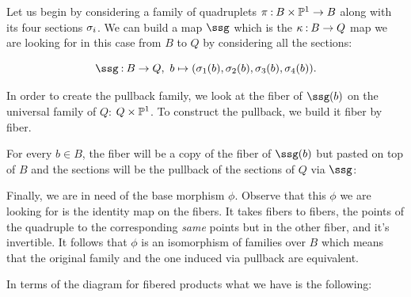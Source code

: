 \documentclass[12pt]{memoir}
\begin{document}
\begin{ptcb}
    Let us begin by considering a family of quadruplets \(\pi\mathbin{:} B\times\mathbb{P}^1\to B\) along with its four sections \(\sigma_i\). We can build a map \(\ssg\) which is the \(\kappa\mathbin{:} B\to Q\) map we are looking for in this case from \(B\) to \(Q\) by considering all the sections:

    \[\ssg\:B\to Q,\ b\mapsto(\sg_1(b),\sg_2(b),\sg_3(b),\sg_4(b)).\]

    In order to create the pullback family, we look at the fiber of \(\ssg(b)\) on the universal family of \(Q\): \(Q\times\mathbb{P}^1\). To construct the pullback, we build it fiber by fiber.\par
    For every \(b\in B\), the fiber will be a copy of the fiber of \(\ssg(b)\) but pasted on top of \(B\) and the sections will be the pullback of the sections of \(Q\) via \(\ssg\):
    \begin{center}
    \end{center}
    Finally, we are in need of the base morphism \(\phi\). Observe that this \(\phi\) we are looking for is the identity map on the fibers. It takes fibers to fibers, the points of the quadruple to the corresponding \emph{same} points but in the other fiber, and it's invertible. It follows that \(\phi\) is an isomorphism of families over \(B\) which means that the original family and the one induced via pullback are equivalent.\par
    In terms of the diagram for fibered products what we have is the following:
    \begin{center}

\end{center}
\end{ptcb}
\end{document}
